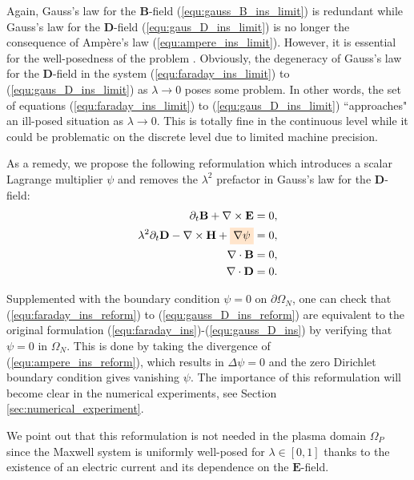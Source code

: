 \documentclass{article}
\begin{document}
Again, Gauss's law for the $\mathbf{B}$-field (\ref{equ:gauss_B_ins_limit}) is redundant while Gauss's law for the $\mathbf{D}$-field (\ref{equ:gaus_D_ins_limit}) is no longer the consequence of Amp\`{e}re's law (\ref{equ:ampere_ins_limit}). However, it is essential for the well-posedness of the problem \cite[][p.  7]{ana_2010}. Obviously, the degeneracy of Gauss's law for the $\mathbf{D}$-field in the system (\ref{equ:faraday_ins_limit}) to (\ref{equ:gaus_D_ins_limit}) as $\lambda \rightarrow 0$ poses some problem. In other words, the set of equations (\ref{equ:faraday_ins_limit}) to (\ref{equ:gaus_D_ins_limit}) ``approaches" an ill-posed situation as $\lambda \rightarrow 0$. This is totally fine in the continuous level while it could be problematic on the discrete level due to limited machine precision. 

As a remedy, we propose the following reformulation which introduces a scalar Lagrange multiplier $\psi$ and removes the $\lambda^2$ prefactor in Gauss's law for the $\mathbf{D}$-field:
\begin{subequations}
\begin{align}
    \partial_t \mathbf{B} + \nabla \times \mathbf{E} &= 0, \label{equ:faraday_ins_reform}\\ 
    \lambda^2 \partial_t \mathbf{D} - \nabla \times \mathbf{H} + \colorbox{orange!20}{$\nabla \psi$} &= 0,  \label{equ:ampere_ins_reform}\\
    \nabla \cdot \mathbf{B} &= 0, \label{equ:gauss_B_ins_reform}\\
    \nabla \cdot \mathbf{D} &= 0 \label{equ:gauss_D_ins_reform}.
\end{align}
\end{subequations}

Supplemented with the boundary condition $\psi = 0$ on $\partial\Omega_N$, one can check that (\ref{equ:faraday_ins_reform}) to (\ref{equ:gauss_D_ins_reform}) are equivalent to the original formulation (\ref{equ:faraday_ins})-(\ref{equ:gauss_D_ins}) by verifying that $\psi = 0$ in $\Omega_N$. This is done by taking the divergence of (\ref{equ:ampere_ins_reform}), which results in $\Delta\psi = 0$ and the zero Dirichlet boundary condition gives vanishing $\psi$. The importance of this reformulation will become clear in the numerical experiments, see Section \ref{sec:numerical_experiment}. 

We point out that this reformulation is not needed in the plasma domain $\Omega_P$ since the Maxwell system is uniformly well-posed for $\lambda \in [0,1]$ thanks to the existence of an electric current and its dependence on the $\mathbf{E}$-field. 
\end{document}
